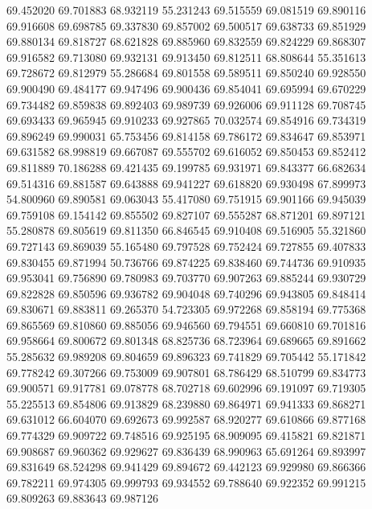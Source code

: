 69.452020
69.701883
68.932119
55.231243
69.515559
69.081519
69.890116
69.916608
69.698785
69.337830
69.857002
69.500517
69.638733
69.851929
69.880134
69.818727
68.621828
69.885960
69.832559
69.824229
69.868307
69.916582
69.713080
69.932131
69.913450
69.812511
68.808644
55.351613
69.728672
69.812979
55.286684
69.801558
69.589511
69.850240
69.928550
69.900490
69.484177
69.947496
69.900436
69.854041
69.695994
69.670229
69.734482
69.859838
69.892403
69.989739
69.926006
69.911128
69.708745
69.693433
69.965945
69.910233
69.927865
70.032574
69.854916
69.734319
69.896249
69.990031
65.753456
69.814158
69.786172
69.834647
69.853971
69.631582
68.998819
69.667087
69.555702
69.616052
69.850453
69.852412
69.811889
70.186288
69.421435
69.199785
69.931971
69.843377
66.682634
69.514316
69.881587
69.643888
69.941227
69.618820
69.930498
67.899973
54.800960
69.890581
69.063043
55.417080
69.751915
69.901166
69.945039
69.759108
69.154142
69.855502
69.827107
69.555287
68.871201
69.897121
55.280878
69.805619
69.811350
66.846545
69.910408
69.516905
55.321860
69.727143
69.869039
55.165480
69.797528
69.752424
69.727855
69.407833
69.830455
69.871994
50.736766
69.874225
69.838460
69.744736
69.910935
69.953041
69.756890
69.780983
69.703770
69.907263
69.885244
69.930729
69.822828
69.850596
69.936782
69.904048
69.740296
69.943805
69.848414
69.830671
69.883811
69.265370
54.723305
69.972268
69.858194
69.775368
69.865569
69.810860
69.885056
69.946560
69.794551
69.660810
69.701816
69.958664
69.800672
69.801348
68.825736
68.723964
69.689665
69.891662
55.285632
69.989208
69.804659
69.896323
69.741829
69.705442
55.171842
69.778242
69.307266
69.753009
69.907801
68.786429
68.510799
69.834773
69.900571
69.917781
69.078778
68.702718
69.602996
69.191097
69.719305
55.225513
69.854806
69.913829
68.239880
69.864971
69.941333
69.868271
69.631012
66.604070
69.692673
69.992587
68.920277
69.610866
69.877168
69.774329
69.909722
69.748516
69.925195
68.909095
69.415821
69.821871
69.908687
69.960362
69.929627
69.836439
68.990963
65.691264
69.893997
69.831649
68.524298
69.941429
69.894672
69.442123
69.929980
69.866366
69.782211
69.974305
69.999793
69.934552
69.788640
69.922352
69.991215
69.809263
69.883643
69.987126
